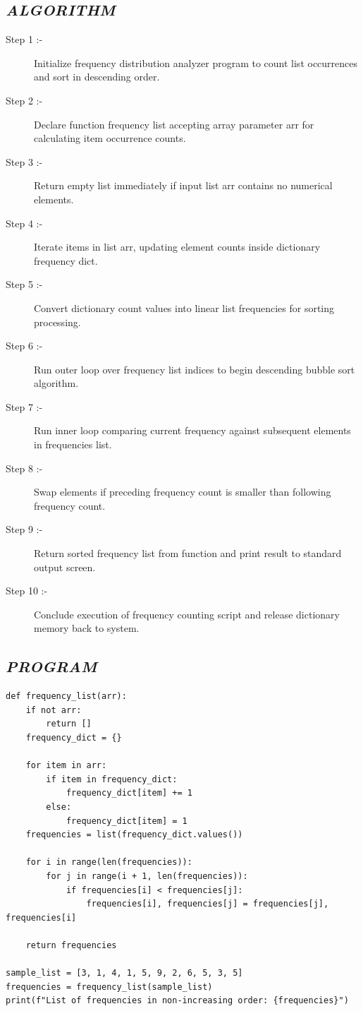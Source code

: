 \documentclass[11pt,a4paper]{article}
\begin{document}
\subsection*{\textit{ALGORITHM}}
\begin{description}
  \item[Step 1 :-] Initialize frequency distribution analyzer program to count list occurrences and sort in descending order.
  \item[Step 2 :-] Declare function frequency list accepting array parameter arr for calculating item occurrence counts.
  \item[Step 3 :-] Return empty list immediately if input list arr contains no numerical elements.
  \item[Step 4 :-] Iterate items in list arr, updating element counts inside dictionary frequency dict.
  \item[Step 5 :-] Convert dictionary count values into linear list frequencies for sorting processing.
  \item[Step 6 :-] Run outer loop over frequency list indices to begin descending bubble sort algorithm.
  \item[Step 7 :-] Run inner loop comparing current frequency against subsequent elements in frequencies list.
  \item[Step 8 :-] Swap elements if preceding frequency count is smaller than following frequency count.
  \item[Step 9 :-] Return sorted frequency list from function and print result to standard output screen.
  \item[Step 10 :-] Conclude execution of frequency counting script and release dictionary memory back to system.
\end{description}

\subsection*{\textit{PROGRAM}}
\begin{lstlisting}[style=pythonstyle]
def frequency_list(arr): 
    if not arr:  
        return [] 
    frequency_dict = {} 
 
    for item in arr: 
        if item in frequency_dict: 
            frequency_dict[item] += 1 
        else: 
            frequency_dict[item] = 1 
    frequencies = list(frequency_dict.values()) 
 
    for i in range(len(frequencies)): 
        for j in range(i + 1, len(frequencies)): 
            if frequencies[i] < frequencies[j]: 
                frequencies[i], frequencies[j] = frequencies[j], frequencies[i] 
 
    return frequencies 

sample_list = [3, 1, 4, 1, 5, 9, 2, 6, 5, 3, 5] 
frequencies = frequency_list(sample_list) 
print(f"List of frequencies in non-increasing order: {frequencies}")
\end{lstlisting}
\end{document}
